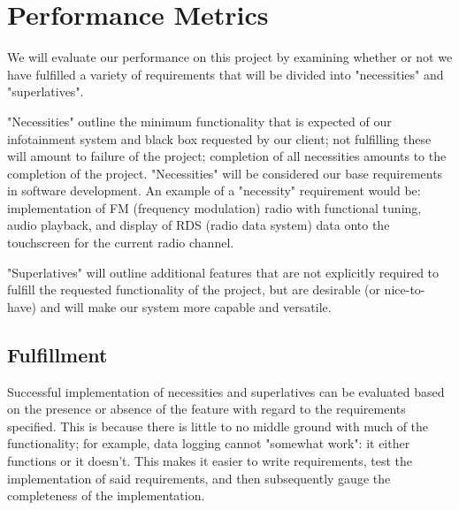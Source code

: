 \documentclass[onecolumn, draftclsnofoot,10pt, compsoc]{IEEEtran}
\begin{document}
\section{Performance Metrics}
We will evaluate our performance on this project by examining whether or not we have fulfilled a variety of requirements that will be divided into "necessities" and "superlatives".\par
"Necessities" outline the minimum functionality that is expected of our infotainment system and black box requested by our client; not fulfilling these will amount to failure of the project; completion of all necessities amounts to the completion of the project. "Necessities" will be considered our base requirements in software development. An example of a "necessity" requirement would be: implementation of FM (frequency modulation) radio with functional tuning, audio playback, and display of RDS (radio data system) data onto the touchscreen for the current radio channel.\par
"Superlatives" will outline additional features that are not explicitly required to fulfill the requested functionality of the project, but are desirable (or nice-to-have) and will make our system more capable and versatile.\par

\subsection{Fulfillment}
Successful implementation of necessities and superlatives can be evaluated based on the presence or absence of the feature with regard to the requirements specified. This is because there is little to no middle ground with much of the functionality; for example, data logging cannot "somewhat work": it either functions or it doesn't. This makes it easier to write requirements, test the implementation of said requirements, and then subsequently gauge the completeness of the implementation.
\end{document}
